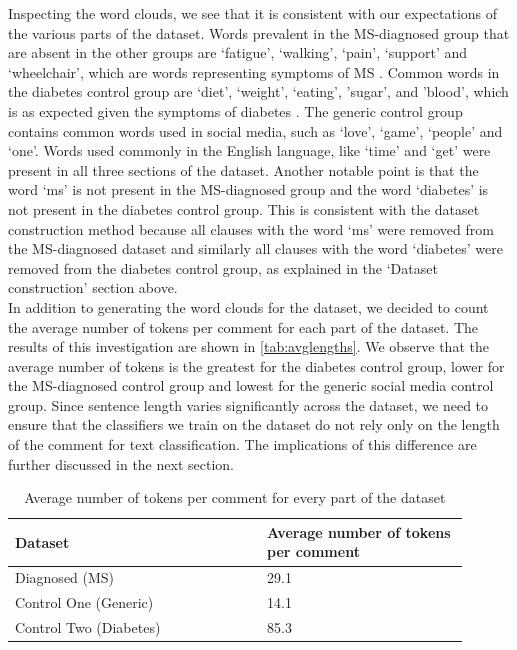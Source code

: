\documentclass[11pt,a4paper]{article}
\begin{document}
\indent Inspecting the word clouds, we see that it is consistent with our expectations of the various parts of the dataset. Words prevalent in the MS-diagnosed group that are absent in the other groups are ‘fatigue’, ‘walking’, ‘pain’, ‘support’ and ‘wheelchair’, which are words representing symptoms of MS \citep{Gustavsen:21}. Common words in the diabetes control group are ‘diet’, ‘weight’, ‘eating’, 'sugar', and 'blood', which is as expected given the symptoms of diabetes \citep{Ramachandran:14}. The generic control group contains common words used in social media, such as ‘love’, ‘game’, ‘people’ and ‘one’. Words used commonly in the English language, like ‘time’ and ‘get’ were present in all three sections of the dataset. Another notable point is that the word ‘ms’ is not present in the MS-diagnosed group and the word ‘diabetes’ is not present in the diabetes control group. This is consistent with the dataset construction method because all clauses with the word ‘ms’ were removed from the MS-diagnosed dataset and similarly all clauses with the word ‘diabetes’ were removed from the diabetes control group, as explained in the ‘Dataset construction’ section above. \\
\indent In addition to generating the word clouds for the dataset, we decided to count the average number of tokens per comment for each part of the dataset. The results of this investigation are shown in \autoref{tab:avglengths}. We observe that the average number of tokens is the greatest for the diabetes control group, lower for the MS-diagnosed control group and lowest for the generic social media control group. Since sentence length varies significantly across the dataset, we need to ensure that the classifiers we train on the dataset do not rely only on the length of the comment for text classification. The implications of this difference are further discussed in the next section.
\begin{table}
\centering
\begin{tabular}{p{0.5\linewidth}p{0.4\linewidth}}
\hline
\textbf{Dataset} & \textbf{Average number of tokens per comment}\\
\hline
Diagnosed (MS) & {29.1} \\
Control One (Generic) & {14.1} \\
Control Two (Diabetes) & {85.3} \\ 
\hline
\end{tabular}
\caption{Average number of tokens per comment for every part of the dataset}
\label{tab:avglengths}
\end{table}
\end{document}
